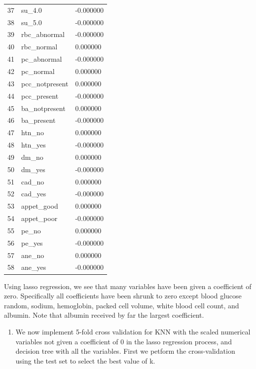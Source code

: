 \documentclass[
  11pt,
  letterpaper,
  DIV=11,
  numbers=noendperiod]{scrartcl}
\providecommand{\tightlist}{%
  \setlength{\itemsep}{0pt}\setlength{\parskip}{0pt}}\usepackage{longtable,booktabs,array}
\begin{document}
\begin{longtable}[]{@{}lll@{}}
37 & su\_4.0 & -0.000000 \\
38 & su\_5.0 & -0.000000 \\
39 & rbc\_abnormal & -0.000000 \\
40 & rbc\_normal & 0.000000 \\
41 & pc\_abnormal & -0.000000 \\
42 & pc\_normal & 0.000000 \\
43 & pcc\_notpresent & 0.000000 \\
44 & pcc\_present & -0.000000 \\
45 & ba\_notpresent & 0.000000 \\
46 & ba\_present & -0.000000 \\
47 & htn\_no & 0.000000 \\
48 & htn\_yes & -0.000000 \\
49 & dm\_no & 0.000000 \\
50 & dm\_yes & -0.000000 \\
51 & cad\_no & 0.000000 \\
52 & cad\_yes & -0.000000 \\
53 & appet\_good & 0.000000 \\
54 & appet\_poor & -0.000000 \\
55 & pe\_no & 0.000000 \\
56 & pe\_yes & -0.000000 \\
57 & ane\_no & 0.000000 \\
58 & ane\_yes & -0.000000 \\
\end{longtable}

Using lasso regression, we see that many variables have been given a
coefficient of zero. Specifically all coefficients have been shrunk to
zero except blood glucose random, sodium, hemoglobin, packed cell
volume, white blood cell count, and albumin. Note that albumin received
by far the largest coefficient.

\begin{enumerate}
\def\labelenumi{\arabic{enumi}.}
\setcounter{enumi}{11}
\tightlist
\item
  We now implement 5-fold cross validation for KNN with the scaled
  numerical variables not given a coefficient of 0 in the lasso
  regression process, and decision tree with all the variables. First we
  petform the cross-validation using the test set to select the best
  value of k.
\end{enumerate}
\end{document}
